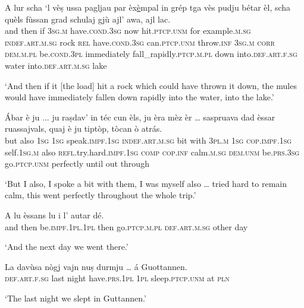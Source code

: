 \begin{linenumbers}
\gll   A lur scha `l vèṣ ussa pagljau par èx\underline{è}mpal in grép tga vès pudju bétar èl, scha quèls fùssan grad schulaj gjù ajl’ awa, ajl lac.\\
and then if \textsc{3sg.m} have.\textsc{cond.3sg} now hit.\textsc{ptcp.unm} for example.\textsc{m.sg} \textsc{indef.art.m.sg} rock \textsc{rel} have.\textsc{cond.3sg} can.\textsc{ptcp.unm} throw.\textsc{inf} \textsc{3sg.m} \textsc{corr} \textsc{dem.m.pl} be.\textsc{cond.3pl} immediately fall\_rapidly.\textsc{ptcp.m.pl} down into.\textsc{def.art.f.sg} water into.\textsc{def.art.m.sg} lake\\
\end{linenumbers}
\medskip
\glt `And then if it [the load] hit a rock which could have thrown it down, the mules would have immediately fallen down rapidly into the water, into the lake.'
\medskip

\begin{linenumbers}
\gll Ábar è ju ... ju raṣdav' in téc cun èls, ju èra mèz èr … saspruava dad èssar ruassajvals, quaj è ju tiptòp, tòcan ò atrás.\\
but also \textsc{1sg} {} \textsc{1sg} speak.\textsc{impf.1sg} \textsc{indef.art.m.sg} bit with \textsc{3pl.m} \textsc{1sg} \textsc{cop.impf.1sg} self.\textsc{1sg.m} also {} \textsc{refl.}try.hard.\textsc{impf.1sg} \textsc{comp} \textsc{cop.inf} calm.\textsc{m.sg} \textsc{dem.unm} be.\textsc{prs.3sg} go.\textsc{ptcp.unm} perfectly until out through \\
\end{linenumbers} 
\medskip
\glt `But I also, I spoke a bit with them, I was myself also … tried hard to remain calm, this went perfectly throughout the whole trip.'
\medskip

\begin{linenumbers}
\gll  A lu èssans lu i l’ autar dé.  \\
and then be.\textsc{impf.1pl.1pl} then go.\textsc{ptcp.m.pl} \textsc{def.art.m.sg} other day \\
\end{linenumbers}
\medskip
\glt `And the next day we went there.'
\medskip

\begin{linenumbers}
\gll   La davùsa nògj vajn nuṣ durmju … á Guottannen. \\
 \textsc{def.art.f.sg} last night have.\textsc{prs.1pl} \textsc{1pl} sleep.\textsc{ptcp.unm} {} at \textsc{pln} \\
\end{linenumbers}
\medskip
\glt `The last night we slept in Guttannen.'
\medskip

